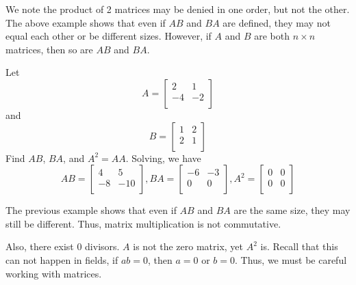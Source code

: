\documentclass{article}
\begin{document}
\begin{remark}
  We note the product of 2 matrices may be denied in one order, but not the other. The above example shows that even if $AB$ and $BA$ are defined, they may not equal each other or be different sizes. However, if $A$ and $B$ are both $n \times n$ matrices, then so are $AB$ and $BA$.
\end{remark}
\begin{example}
  Let
  \[A =
    \begin{bmatrix}
      2 & 1\\
      -4 & -2\\
  \end{bmatrix}\]
  and \[B =
    \begin{bmatrix}
      1 & 2\\
      2 &1\\
  \end{bmatrix}\]
  Find $AB$, $BA$, and $A^2 = AA$.
  Solving, we have
  \[
    AB =
    \begin{bmatrix}
      4 & 5\\
      -8 & -10\\
    \end{bmatrix}, BA =
    \begin{bmatrix}
      -6 & -3\\
      0 & 0\\
    \end{bmatrix}, A^2 =
    \begin{bmatrix}
      0 & 0\\
      0 & 0\\
    \end{bmatrix}
  \]
\end{example}
\begin{remark}
  The previous example shows that even if $AB$ and $BA$ are the same size, they may still be different. Thus, matrix multiplication is not commutative.

  Also, there exist $0$ divisors. $A$ is not the zero matrix, yet $A^2$ is.
  Recall that this can not happen in fields, if $ab = 0$, then $a = 0$ or $b = 0$.
  Thus, we must be careful working with matrices.
\end{remark}
\end{document}
